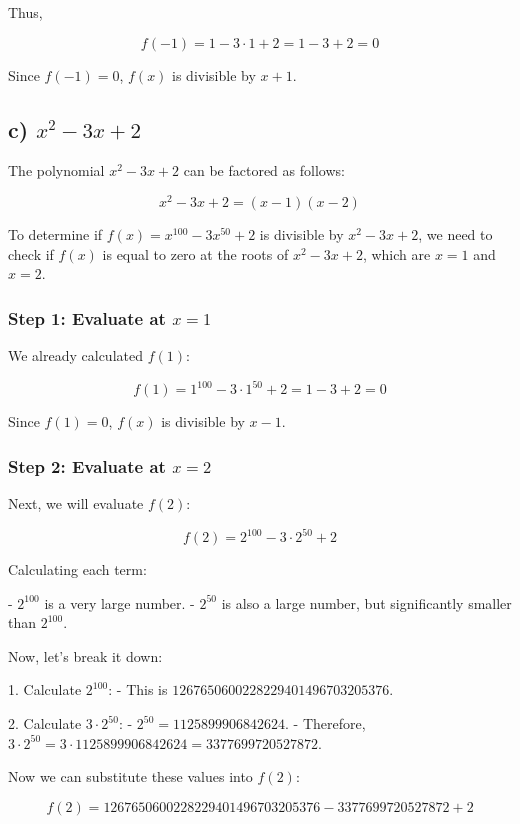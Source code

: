 \documentclass{article}
\begin{document}
Thus,

\[
f(-1) = 1 - 3 \cdot 1 + 2 = 1 - 3 + 2 = 0
\]

Since \( f(-1) = 0 \), \( f(x) \) is divisible by \( x + 1 \).

\subsection*{c) \( x^2 - 3x + 2 \)}

The polynomial \( x^2 - 3x + 2 \) can be factored as follows:

\[
x^2 - 3x + 2 = (x - 1)(x - 2)
\]

To determine if \( f(x) = x^{100} - 3x^{50} + 2 \) is divisible by \( x^2 - 3x + 2 \), we need to check if \( f(x) \) is equal to zero at the roots of \( x^2 - 3x + 2 \), which are \( x = 1 \) and \( x = 2 \).

\subsubsection*{Step 1: Evaluate at \( x = 1 \)}

We already calculated \( f(1) \):

\[
f(1) = 1^{100} - 3 \cdot 1^{50} + 2 = 1 - 3 + 2 = 0
\]

Since \( f(1) = 0 \), \( f(x) \) is divisible by \( x - 1 \). 

\subsubsection*{Step 2: Evaluate at \( x = 2 \)}

Next, we will evaluate \( f(2) \):

\[
f(2) = 2^{100} - 3 \cdot 2^{50} + 2
\]

Calculating each term:

- \( 2^{100} \) is a very large number.
- \( 2^{50} \) is also a large number, but significantly smaller than \( 2^{100} \).

Now, let's break it down:

1. Calculate \( 2^{100} \):
   - This is \( 1267650600228229401496703205376 \).

2. Calculate \( 3 \cdot 2^{50} \):
   - \( 2^{50} = 1125899906842624 \).
   - Therefore, \( 3 \cdot 2^{50} = 3 \cdot 1125899906842624 = 3377699720527872 \).

Now we can substitute these values into \( f(2) \):

\[
f(2) = 1267650600228229401496703205376 - 3377699720527872 + 2
\]
\end{document}
